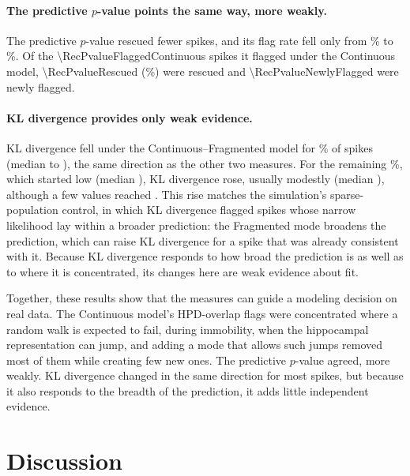 \documentclass[12pt]{article}
\begin{document}
\paragraph{The predictive $p$-value points the same way, more weakly.} The predictive $p$-value rescued fewer spikes, and its flag rate fell only from \RecPvalueFlagRateContinuous\% to \RecPvalueFlagRateFragmented\%. Of the \num{\RecPvalueFlaggedContinuous} spikes it flagged under the Continuous model, \num{\RecPvalueRescued} (\RecPvalueRescuedPercent\%) were rescued and \num{\RecPvalueNewlyFlagged} were newly flagged.

\paragraph{KL divergence provides only weak evidence.} KL divergence fell under the Continuous--Fragmented model for \RecKlLowerPercent\% of spikes (median \RecKlLowerMedianContinuous{} to \RecKlLowerMedianFragmented), the same direction as the other two measures. For the remaining \RecKlHigherPercent\%, which started low (median \RecKlHigherContinuousMedian), KL divergence rose, usually modestly (median \RecKlHigherFragmentedMedian), although a few values reached \RecKlHigherFragmentedMax. This rise matches the simulation's sparse-population control, in which KL divergence flagged spikes whose narrow likelihood lay within a broader prediction: the Fragmented mode broadens the prediction, which can raise KL divergence for a spike that was already consistent with it. Because KL divergence responds to how broad the prediction is as well as to where it is concentrated, its changes here are weak evidence about fit.

Together, these results show that the measures can guide a modeling decision on real data. The Continuous model's HPD-overlap flags were concentrated where a random walk is expected to fail, during immobility, when the hippocampal representation can jump, and adding a mode that allows such jumps removed most of them while creating few new ones. The predictive $p$-value agreed, more weakly. KL divergence changed in the same direction for most spikes, but because it also responds to the breadth of the prediction, it adds little independent evidence.

\section*{Discussion}\label{sec:discussion}
\end{document}
